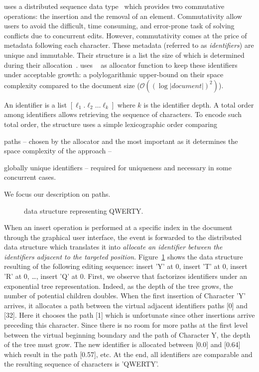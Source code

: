 \CRATE uses a distributed sequence data type~\cite{shapiro2011conflict} which
provides two commutative operations: the insertion and the removal of an
element. Commutativity allow users to avoid the difficult, time consuming, and
error-prone task of solving conflicts due to concurrent edits. However,
commutativity comes at the price of metadata following each character. These
metadata (referred to as \emph{identifiers}) are unique and immutable. Their
structure is a list the size of which is determined during their
allocation~\cite{preguica2009commutative, weiss2009logoot}. \CRATE uses
\LSEQ~\cite{nedelec2013lseq} as allocator function to keep these identifiers
under acceptable growth: a polylogarithmic upper-bound on their space complexity
compared to the document size ($\mathcal{O}((\log |document|)^2)$).

An identifier is a list $[\ell_1.\ell_2\ldots\ell_k]$ where $k$ is the
identifier depth. A total order among identifiers allows retrieving the
sequence of characters. To encode such total order, the structure uses a simple
lexicographic order comparing
\begin{inparaenum}[(i)]
\item paths -- chosen by the allocator and the most important as it determines
  the space complexity of the approach --
\item globally unique identifiers -- required for uniqueness and necessary in
  some concurrent cases.
\end{inparaenum}
We focus our description on paths.

\begin{figure}
  \centering
  
  \caption{\label{fig:lseqexample}\LSEQ data structure representing QWERTY.}
\end{figure}

When an insert operation is performed at a specific index in the document
through the graphical user interface, the event is forwarded to the distributed
data structure which translates it into \emph{allocate an identifier between the
  identifiers adjacent to the targeted position}.  Figure~\ref{fig:lseqexample}
shows the data structure resulting of the following editing sequence: insert 'Y'
at 0, insert 'T' at 0, insert 'R' at 0, \ldots, insert 'Q' at 0. First, we
observe that \LSEQ factorizes identifiers under an exponential tree
representation. Indeed, as the depth of the tree grows, the number of potential
children doubles. When the first insertion of Character 'Y' arrives, it
allocates a path between the virtual adjacent identifiers paths [0] and
[32]. Here it chooses the path [1] which is unfortunate since other insertions
arrive preceding this character. Since there is no room for more paths at the
first level between the virtual beginning boundary and the path of Character Y,
the depth of the tree must grow. The new identifier is allocated between [0.0]
and [0.64] which result in the path [0.57], etc. At the end, all identifiers are
comparable and the resulting sequence of characters is 'QWERTY'.

